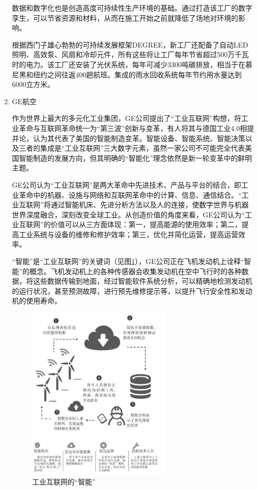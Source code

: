 \documentclass[lang=cn,12pt,bibtex,newtx,twoside,margintrue,citestyle=gb7714-2015, bibstyle=gb7714-2015]{elegantbook}
\begin{document}
\begin{enumerate}
数据和数字化也是创造高度可持续性生产环境的基础。通过打造该工厂的数字孪生，可以节省资源和材料，从而在施工开始之前就降低了场地对环境的影响。

根据西门子雄心勃勃的可持续发展框架DEGREE，新工厂还配备了自动LED照明、高效泵、风扇和冷却元件，所有这些将让工厂每年节省超过500万千瓦时的电力。该工厂还安装了光伏系统，每年可减少3300吨碳排放，相当于在慕尼黑和纽约之间往返400趟航班。集成的雨水回收系统每年节约用水量达到6000立方米。

\item GE航空
\label{sec:org925a1d2}

作为世界上最大的多元化工业集团，GE公司提出了“工业互联网”构想，将工业革命与互联网革命统一为“第三波”创新与变革，有人将其与德国工业4.0相提并论，认为其代表了美国的智能制造变革。智能设备、智能系统、智能决策以及三者的集成是“工业互联网”三大数字元素，虽然一家公司不可能完全代表美国智能制造的发展方向，但其明确的“智能化”理念依然是新一轮变革中的鲜明主题。

GE公司认为“工业互联网”是两大革命中先进技术、产品与平台的结合，即工业革命中的机器、设施与网络和互联网革命中的计算、信息、通信结合\cite{Evans2012}。“工业互联网”将通过智能机床、先进分析方法以及人的连接，使数字世界与机器世界深度融合，深刻改变全球工业。从创造价值的角度来看，GE公司认为“工业互联网”的价值可以从三方面体现：第一，提高能源的使用效率；第二，提高工业系统与设备的维修和修护效率；第三，优化并简化运营，提高运营效率。

“智能”是“工业互联网”的关键词（见图\ref{4.5}），GE公司正在飞机发动机上诠释“智能”的概念。飞机发动机上的各种传感器会收集发动机在空中飞行时的各种数据，将这些数据传输到地面，经过智能软件系统分析，可以精确地检测发动机的运行状况，甚至预测故障，进行预先维修提示等，以提升飞行安全性和发动机的使用寿命。

\begin{figure}[htbp]
\centering
\includegraphics[angle=0,width=7cm]{./figure/4.5.png}
\caption{\label{4.5}工业互联网的“智能”}
\end{figure}



\end{enumerate}
\end{document}
